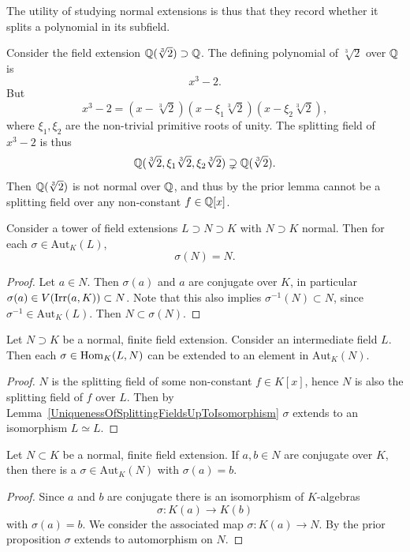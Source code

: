     The utility of studying normal extensions is thus that they record whether it splits a polynomial in its subfield. 
    \begin{example}
        Consider the field extension $\mathbb{Q}(\sqrt[3]{2})\supset \mathbb{Q}$. The defining polynomial of $\sqrt[3]{2}$ over $\mathbb{Q}$ is 
        $$
            x^3-2.
        $$
        But 
        $$
            x^3 - 2 = (x-\sqrt[3]{2})(x-\xi_1\sqrt[3]{2})(x-\xi_2\sqrt[3]{2}),
        $$
        where $\xi_1,\xi_2$ are the non-trivial primitive roots of unity. The splitting field of $x^3-2$ is thus 
        $$
            \mathbb{Q}(\sqrt[3]{2},\xi_1\sqrt[3]{2},\xi_2\sqrt[3]{2}) \supsetneq \mathbb{Q}(\sqrt[3]{2}).
        $$
        Then $\mathbb{Q}(\sqrt[3]{2})$ is not normal over $\mathbb{Q}$, and thus by the prior lemma cannot be a splitting field over any non-constant $f\in \mathbb{Q}[x]$.  
    \end{example} 
\begin{lemma}\label{AutomorphismFixesImageOfNormalFieldExtension}
    Consider a tower of field extensions $L\supset N \supset K$ with $N\supset K$ normal. Then for each $\sigma \in \mathrm{Aut}_K(L)$, 
    $$
        \sigma(N) = N.
    $$
\end{lemma}
\begin{proof}
    Let $a\in N$. Then $\sigma(a)$ and $a$ are conjugate over $K$, in particular $\sigma(a)\in V(\mathrm{Irr}(a,K))\subset N$. Note that this also implies $\sigma^{-1}(N)\subset N$, since $\sigma^{-1}\in \mathrm{Aut}_K(L)$. Then $N\subset \sigma(N)$.     
\end{proof}

\begin{proposition}\label{HomomorphismOfIntermediateFieldOfNormalFiniteFieldCanBeExtentedToAutomorphim}
    Let $N\supset K$ be a normal, finite field extension. Consider an intermediate field $L$. Then each $\sigma\in \mathrm{Hom}_K(L,N)$ can be extended to an element in $\mathrm{Aut}_K(N)$. 
\end{proposition}
\begin{proof}
    $N$ is the splitting field of some non-constant $f\in K[x]$, hence $N$ is also the splitting field of $f$ over $L$. Then by Lemma~\ref{UniquenessOfSplittingFieldsUpToIsomorphism} $\sigma$ extends to an isomorphism $L\simeq L$. 
\end{proof}

\begin{corollary}\label{ExistAutomorphismSendingElementToAConjugate}
    Let $N\subset K$ be a normal, finite field extension. If $a,b\in N$ are conjugate over $K$, then there is a $\sigma\in \mathrm{Aut}_K(N)$ with $\sigma(a)=b$. 
\end{corollary}
\begin{proof}
    Since $a$ and $b$ are conjugate there is an isomorphism of $K$-algebras 
    $$
        \sigma: K(a)\rightarrow K(b)
    $$
    with $\sigma(a) = b$. We consider the associated map $\sigma : K(a)\rightarrow N$. By the prior proposition $\sigma$ extends to automorphism on $N$. 
\end{proof}

